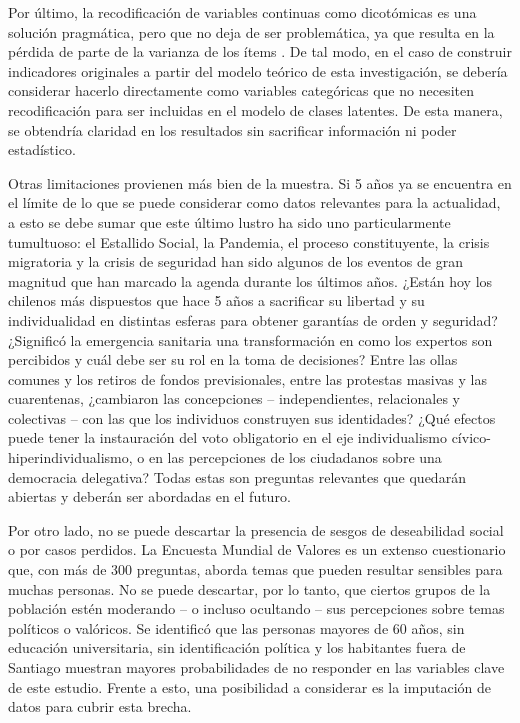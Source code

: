 \documentclass[12pt,twoside]{templates/facsothesis}
\begin{document}
Por último, la recodificación de variables continuas como dicotómicas es una solución pragmática, pero que no deja de ser problemática, ya que resulta en la pérdida de parte de la varianza de los ítems \citep{fernandes2019}. De tal modo, en el caso de construir indicadores originales a partir del modelo teórico de esta investigación, se debería considerar hacerlo directamente como variables categóricas que no necesiten recodificación para ser incluidas en el modelo de clases latentes. De esta manera, se obtendría claridad en los resultados sin sacrificar información ni poder estadístico.

Otras limitaciones provienen más bien de la muestra. Si 5 años ya se encuentra en el límite de lo que se puede considerar como datos relevantes para la actualidad, a esto se debe sumar que este último lustro ha sido uno particularmente tumultuoso: el Estallido Social, la Pandemia, el proceso constituyente, la crisis migratoria y la crisis de seguridad han sido algunos de los eventos de gran magnitud que han marcado la agenda durante los últimos años. ¿Están hoy los chilenos más dispuestos que hace 5 años a sacrificar su libertad y su individualidad en distintas esferas para obtener garantías de orden y seguridad? ¿Significó la emergencia sanitaria una transformación en como los expertos son percibidos y cuál debe ser su rol en la toma de decisiones? Entre las ollas comunes y los retiros de fondos previsionales, entre las protestas masivas y las cuarentenas, ¿cambiaron las concepciones -- independientes, relacionales y colectivas -- con las que los individuos construyen sus identidades? ¿Qué efectos puede tener la instauración del voto obligatorio en el eje individualismo cívico-hiperindividualismo, o en las percepciones de los ciudadanos sobre una democracia delegativa? Todas estas son preguntas relevantes que quedarán abiertas y deberán ser abordadas en el futuro.

Por otro lado, no se puede descartar la presencia de sesgos de deseabilidad social o por casos perdidos. La Encuesta Mundial de Valores es un extenso cuestionario que, con más de 300 preguntas, aborda temas que pueden resultar sensibles para muchas personas. No se puede descartar, por lo tanto, que ciertos grupos de la población estén moderando -- o incluso ocultando -- sus percepciones sobre temas políticos o valóricos. Se identificó que las personas mayores de 60 años, sin educación universitaria, sin identificación política y los habitantes fuera de Santiago muestran mayores probabilidades de no responder en las variables clave de este estudio. Frente a esto, una posibilidad a considerar es la imputación de datos para cubrir esta brecha.
\end{document}

